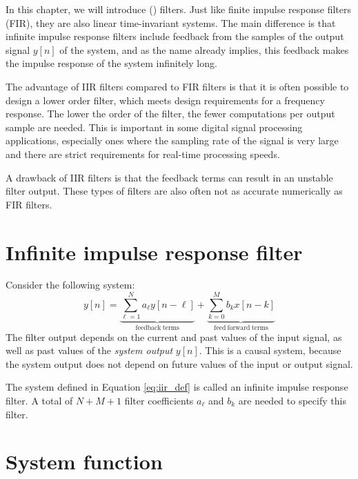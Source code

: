 In this chapter, we will introduce  () filters. Just like finite
impulse response filters (FIR), they are also linear time-invariant
systems. The main difference is that infinite impulse response filters
include feedback from the samples of the output signal $y[n]$ of the
system, and as the name already implies, this feedback makes the
impulse response of the system infinitely long.

The advantage of IIR filters compared to FIR filters is that it is
often possible to design a lower order filter, which meets design
requirements for a frequency response. The lower the order of the
filter, the fewer computations per output sample are needed. This is
important in some digital signal processing applications, especially
ones where the sampling rate of the signal is very large and there are
strict requirements for real-time processing speeds.

A drawback of IIR filters is that the feedback terms can result in an
unstable filter output. These types of filters are also often not
as accurate numerically as FIR filters.

\section{Infinite impulse response filter}
Consider the following system:
\begin{equation}
    \boxed{
        y[n] = \underbrace{\sum_{\ell=1}^{N} a_{\ell} y[n-\ell]}_{\mathrm{feedback~terms}} + \underbrace{\sum_{k=0}^{M} b_k x[n-k]}_{\mathrm{feed~forward~terms}}
        \label{eq:iir_def}
    }
\end{equation}
The filter output depends on the current and past values of the input
signal, as well as past values of the \emph{system output}
$y[n]$. This is a causal system,
because the system output does not depend on future values of the input or output signal.

The system defined in Equation \ref{eq:iir_def} is called an infinite
impulse response filter. A total of $N+M+1$ filter coefficients
$a_{\ell}$ and $b_k$ are needed to specify this filter.

\section{System function}

